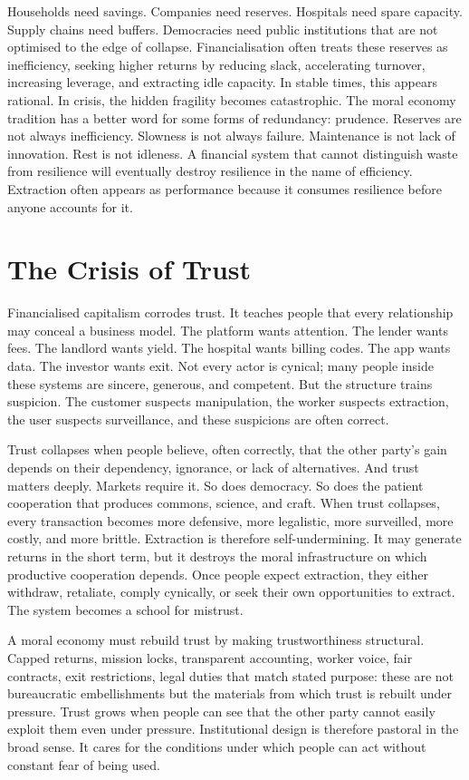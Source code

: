 \documentclass[11pt,a4paper,oneside]{book}
\begin{document}
Households need savings. Companies need reserves. Hospitals need spare capacity. Supply chains need buffers. Democracies need public institutions that are not optimised to the edge of collapse. Financialisation often treats these reserves as inefficiency, seeking higher returns by reducing slack, accelerating turnover, increasing leverage, and extracting idle capacity. In stable times, this appears rational. In crisis, the hidden fragility becomes catastrophic. The moral economy tradition has a better word for some forms of redundancy: prudence. Reserves are not always inefficiency. Slowness is not always failure. Maintenance is not lack of innovation. Rest is not idleness. A financial system that cannot distinguish waste from resilience will eventually destroy resilience in the name of efficiency. Extraction often appears as performance because it consumes resilience before anyone accounts for it.

\section*{The Crisis of Trust}

Financialised capitalism corrodes trust. It teaches people that every relationship may conceal a business model. The platform wants attention. The lender wants fees. The landlord wants yield. The hospital wants billing codes. The app wants data. The investor wants exit. Not every actor is cynical; many people inside these systems are sincere, generous, and competent. But the structure trains suspicion. The customer suspects manipulation, the worker suspects extraction, the user suspects surveillance, and these suspicions are often correct.

Trust collapses when people believe, often correctly, that the other party's gain depends on their dependency, ignorance, or lack of alternatives. And trust matters deeply. Markets require it. So does democracy. So does the patient cooperation that produces commons, science, and craft. When trust collapses, every transaction becomes more defensive, more legalistic, more surveilled, more costly, and more brittle. Extraction is therefore self-undermining. It may generate returns in the short term, but it destroys the moral infrastructure on which productive cooperation depends. Once people expect extraction, they either withdraw, retaliate, comply cynically, or seek their own opportunities to extract. The system becomes a school for mistrust.

A moral economy must rebuild trust by making trustworthiness structural. Capped returns, mission locks, transparent accounting, worker voice, fair contracts, exit restrictions, legal duties that match stated purpose: these are not bureaucratic embellishments but the materials from which trust is rebuilt under pressure. Trust grows when people can see that the other party cannot easily exploit them even under pressure. Institutional design is therefore pastoral in the broad sense. It cares for the conditions under which people can act without constant fear of being used.
\end{document}
